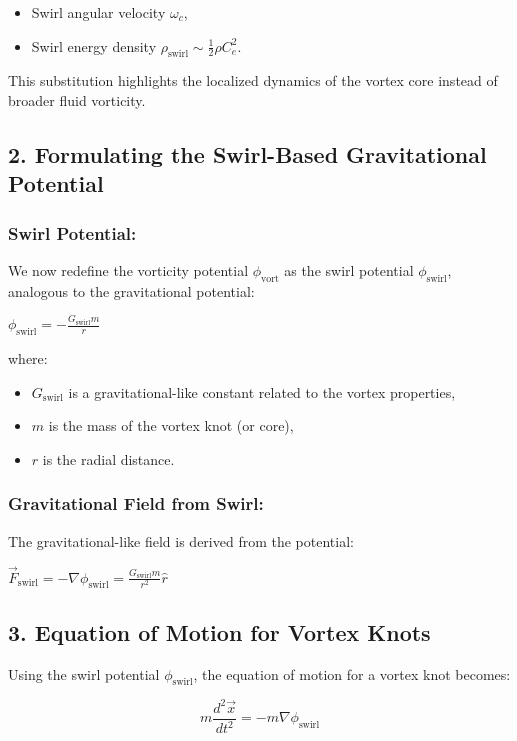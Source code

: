 {\begin{itemize}
\item Swirl angular velocity \(\omega_c\),

\item Swirl energy density \(\rho_\text{swirl} \sim \frac{1}{2} \rho C_e^2\).
\end{itemize}
This substitution highlights the localized dynamics of the vortex core instead of broader fluid vorticity.

\subsection*{2. Formulating the Swirl-Based Gravitational Potential}
\subsubsection*{Swirl Potential:}
We now redefine the vorticity potential \(\phi_\text{vort}\) as the swirl potential \(\phi_\text{swirl}\), analogous to the gravitational potential:

\(\phi_\text{swirl} = -\frac{G_\text{swirl} m}{r}\)

where:

\begin{itemize}
\item \(G_\text{swirl}\) is a gravitational-like constant related to the vortex properties,

\item \(m\) is the mass of the vortex knot (or core),

\item \(r\) is the radial distance.
\end{itemize}
\subsubsection*{Gravitational Field from Swirl:}
The gravitational-like field is derived from the potential:

\(\vec{F}_\text{swirl} = -\nabla \phi_\text{swirl} = \frac{G_\text{swirl} m}{r^2} \hat{r}\)

\subsection*{3. Equation of Motion for Vortex Knots}
Using the swirl potential \(\phi_\text{swirl}\), the equation of motion for a vortex knot becomes:

\[m \frac{d^2 \vec{x}}{dt^2} = -m \nabla \phi_\text{swirl}\]

}
